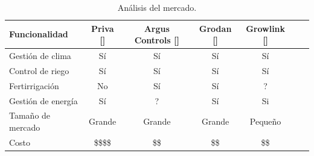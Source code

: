 %


\begin{table}[h]
\centering
\caption[Análisis del estado del arte]{Análisis del mercado.}

\begin{tabular}{lcccccc} 
\toprule
\textbf{Funcionalidad} & \textbf{Priva []}  & \textbf{Argus Controls []} &\textbf{Grodan []} & \textbf{Growlink []}\\

\midrule
Gestión de clima   & Sí & Sí & Sí & Sí \\
Control de riego   & Sí & Sí & Sí & Sí \\
Fertirrigación     & No & Sí & Sí & ? \\
Gestión de energía & Sí & ? & Sí & Si \\
Tamaño de mercado  & Grande &  Grande & Grande & Pequeño \\
Costo              & \$\$\$\$ &  \$\$ & \$\$ &  \$\$ \\
\bottomrule
\hline
\end{tabular}
\label{tab:vendors}
\end{table}

